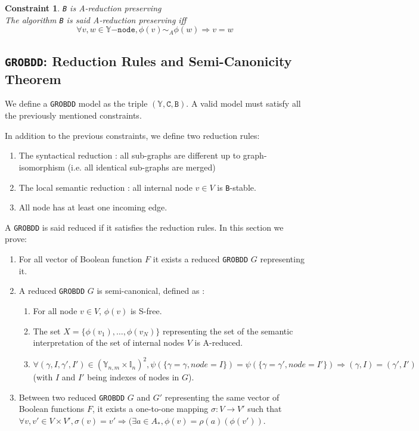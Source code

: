 \documentclass[a4paper,10pt]{article}
\newcommand{\Y}{\mathbb{Y}}
\newcommand{\I}{\mathbb{I}}
\newcommand{\Ynode}{\Y\mathtt{-node}}
\newcommand{\GroBdd}{\texttt{GROBDD}}
\newtheorem{newcons}{Constraint}
\newcommand{\constraint}[2]{\begin{newcons}{#1\\}#2\end{newcons}}
\begin{document}
\constraint{\texttt{B} is A-reduction preserving}
{The algorithm \texttt{B} is said A-reduction preserving iff
\[\forall v, w \in\Ynode, \phi(v) \sim_A \phi(w) \Rightarrow v = w\]}

\subsection{\GroBdd{}: Reduction Rules and Semi-Canonicity Theorem\label{grobdd-reduction}}
We define a \GroBdd{} model as the triple $(\Y, \mathtt{C}, \mathtt{B})$.
A valid model must satisfy all the previously mentioned constraints.

In addition to the previous constraints, we define two reduction rules:\begin{enumerate}
\item The syntactical reduction : all sub-graphs are different up to graph-isomorphism (i.e. all identical sub-graphs are merged)
\item The local semantic reduction : all internal node $v\in V$ is \texttt{B}-stable.
\item All node has at least one incoming edge.
\end{enumerate}
A \GroBdd{} is said reduced if it satisfies the reduction rules.
In this section we prove:\begin{enumerate}
\item For all vector of Boolean function $F$ it exists a reduced \GroBdd{} $G$ representing it.
\item A reduced \GroBdd{} $G$ is semi-canonical, defined as :\begin{enumerate}
\item For all node $v\in V$, $\phi(v)$ is S-free.
\item The set $X = \{\phi(v_1), \dots, \phi(v_N)\}$ representing the set of the semantic interpretation of the set of internal nodes $V$ is A-reduced.
\item $\forall (\gamma, I, \gamma', I') \in (\Y_{n, m} \times \I_n)^2, \psi(\{\gamma = \gamma, node = I\}) = \psi(\{\gamma = \gamma', node = I'\}) \Rightarrow (\gamma, I) = (\gamma', I')$ (with $I$ and $I'$ being indexes of nodes in $G$).
\end{enumerate}
\item Between two reduced \GroBdd{} $G$ and $G'$ representing the same vector of Boolean functions $F$, it exists a one-to-one mapping $\sigma : V \longrightarrow V'$ such that $\forall v, v' \in V \times V', \sigma(v) = v' \Rightarrow (\exists a \in A_{*}, \phi(v) = \rho(a)(\phi(v'))$.
\end{enumerate}
\end{document}
